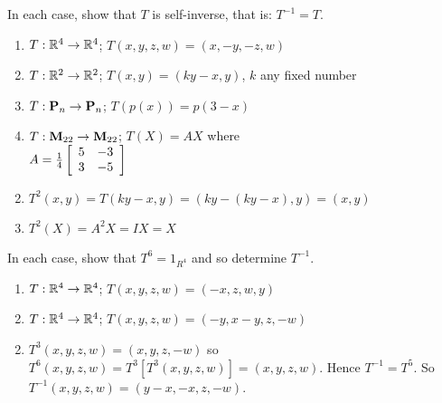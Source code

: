 \begin{multicols}{2}
\begin{ex}
\begin{sol}
\begin{enumerate}[label={\alph*.}]
\end{enumerate}
\end{sol}
\end{ex}

\begin{ex}
In each case, show that $T$ is self-inverse, that is: $T^{-1} = T$.


\begin{enumerate}[label={\alph*.}]
\item $T : \mathbb{R}^4 \to \mathbb{R}^4$; $T(x, y, z, w) = (x, -y, -z, w)$

\item $T : \mathbb{R}^2 \to \mathbb{R}^2$; $T(x, y) = (ky - x, y)$, $k$ any fixed number

\item $T : \textbf{P}_{n} \to \textbf{P}_{n}$; $T(p(x)) = p(3 - x)$

\item $T : \textbf{M}_{22} \to \textbf{M}_{22}$; $T(X) = AX$ where \\ $A = \tfrac{1}{4}\left[ \begin{array}{rr}
5 & -3 \\
3 & -5
\end{array} \right]$

\end{enumerate}
\begin{sol}
\begin{enumerate}[label={\alph*.}]
\setcounter{enumi}{1}
\item $T^{2}(x, y) = T(ky - x, y) = (ky - (ky - x), y) = (x, y)$

\setcounter{enumi}{3}
\item $T^{2}(X) = A^{2}X = IX = X$

\end{enumerate}
\end{sol}
\end{ex}

\begin{ex}
In each case, show that $T^{6} = 1_{R^4}$ and so determine $T^{-1}$.


\begin{enumerate}[label={\alph*.}]
\item $T : \mathbb{R}^4 \to \mathbb{R}^4$; $T(x, y, z, w) = (-x, z, w, y)$

\item $T : \mathbb{R}^4 \to \mathbb{R}^4$; $T(x, y, z, w) = (-y, x - y, z, -w)$

\end{enumerate}
\begin{sol}
\begin{enumerate}[label={\alph*.}]
\setcounter{enumi}{1}
\item $T^{3}(x, y, z, w) = (x, y, z, -w)$ so $T^{6}(x, y, z, w) = T^{3}\left[T^{3}(x, y, z, w)\right] = (x, y, z, w)$. Hence $T^{-1} = T^{5}$. So $T^{-1}(x, y, z, w) = (y - x, -x, z, -w)$.


\end{enumerate}
\end{sol}
\end{ex}
\end{multicols}
